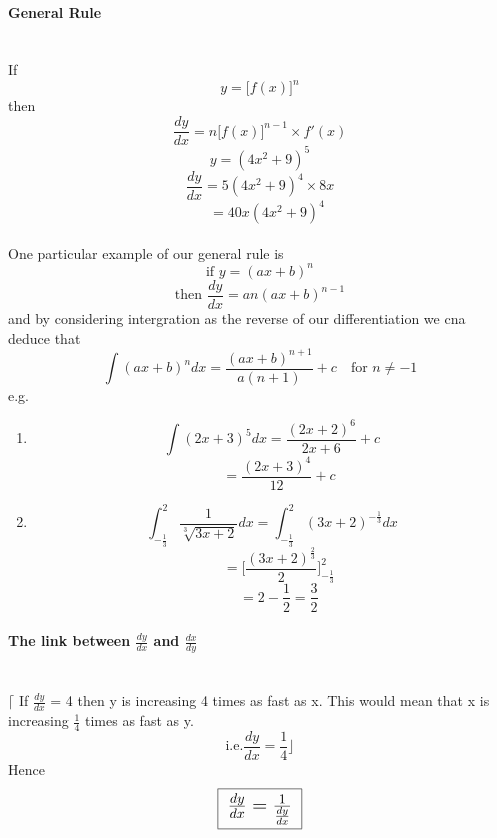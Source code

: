 \documentclass[a4paper]{article}
\begin{document}
\paragraph{General Rule}\mbox{}\\
If \[y=\big[ f(x) \big]^n\]
then \[\frac{dy}{dx} = n \big[ f(x) \big]^{n-1} \times f'(x)\]
\[y=(4x^2+9)^5\]
\[\frac{dy}{dx} = 5(4x^2+9)^4 \times 8x\]
\[\quad = 40x(4x^2+9)^4\]
\\
One particular example of our general rule is
\[\text{if }y=(ax+b)^n \]
\[\text{then }\frac{dy}{dx} = an(ax+b)^{n-1} \]
and by considering intergration as the reverse of our differentiation we cna deduce that
\large
\[\int(ax+b)^n dx = \frac{(ax+b)^{n+1}}{a(n+1)}+c \quad \text{for } n\neq-1 \]
e.g.
\begin{enumerate}
  \item
  \[\int(2x+3)^5dx=\frac{(2x+2)^6}{2x+6}+c\]
  \[\quad = \frac{(2x+3)^4}{12}+c \]
  \item
  \[\int^{2}_{-\frac{1}{3}} \frac{1}{\sqrt[3]{3x+2}}dx = \int^{2}_{-\frac{1}{3}} (3x+2)^{-\frac{1}{3}}dx \]
  \[\quad = \bigg[\frac{(3x+2)^{\frac{2}{3}}}{2} \bigg]^{2}_{-\frac{1}{3}} \]
  \[\quad = 2-\frac{1}{2} =\frac{3}{2} \]
  \normalsize
\end{enumerate}
\normalsize
\paragraph{The link between $\frac{dy}{dx}$ and $\frac{dx}{dy}$}\mbox{}\\
$\Big\lceil$ If $\frac{dy}{dx}$ = 4 then y is increasing 4 times as fast as x. This would mean that x is increasing $\frac{1}{4}$ times as fast as y.\\
\[\text{i.e.} \frac{dy}{dx} = \frac{1}{4} \Big\rfloor \]
Hence
\[
\Large
\framebox[1.1\width]{
$\frac{dy}{dx} = \frac{1}{\frac{dy}{dx}}$
}
\normalsize\]
\end{document}
